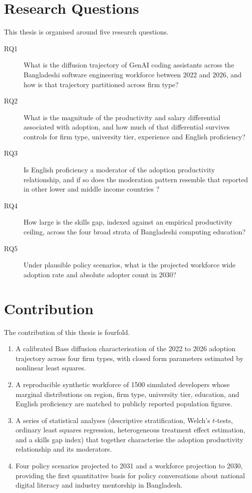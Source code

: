 \documentclass[11pt,a4paper]{report}
\begin{document}
\section{Research Questions}

This thesis is organised around five research questions.

\begin{description}
  \item[RQ1] What is the diffusion trajectory of GenAI coding assistants
  across the Bangladeshi software engineering workforce between 2022 and
  2026, and how is that trajectory partitioned across firm type?
  \item[RQ2] What is the magnitude of the productivity and salary
  differential associated with adoption, and how much of that differential
  survives controls for firm type, university tier, experience and
  English proficiency?
  \item[RQ3] Is English proficiency a moderator of the adoption
  productivity relationship, and if so does the moderation pattern
  resemble that reported in other lower and middle income countries
  \citep{NurFarhanaTalukder2024}?
  \item[RQ4] How large is the skills gap, indexed against an empirical
  productivity ceiling, across the four broad strata of Bangladeshi
  computing education?
  \item[RQ5] Under plausible policy scenarios, what is the projected
  workforce wide adoption rate and absolute adopter count in 2030?
\end{description}

\section{Contribution}

The contribution of this thesis is fourfold.

\begin{enumerate}
  \item A calibrated Bass diffusion characterisation of the 2022 to 2026
  adoption trajectory across four firm types, with closed form parameters
  estimated by nonlinear least squares.
  \item A reproducible synthetic workforce of 1500 simulated developers
  whose marginal distributions on region, firm type, university tier,
  education, and English proficiency are matched to publicly reported
  population figures.
  \item A series of statistical analyses (descriptive stratification,
  Welch's $t$-tests, ordinary least squares regression, heterogeneous
  treatment effect estimation, and a skills gap index) that together
  characterise the adoption productivity relationship and its moderators.
  \item Four policy scenarios projected to 2031 and a workforce
  projection to 2030, providing the first quantitative basis for policy
  conversations about national digital literacy and industry mentorship
  in Bangladesh.
\end{enumerate}
\end{document}
